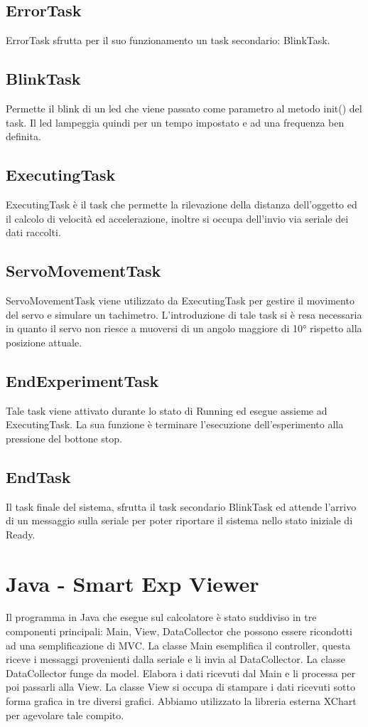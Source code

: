 \documentclass[a4paper,12pt]{report}
\begin{document}
\section{ErrorTask}
ErrorTask sfrutta per il suo funzionamento un task secondario: BlinkTask.

\section{BlinkTask}
Permette il blink di un led che viene passato come parametro al metodo init() del task. Il led lampeggia quindi per un tempo impostato e ad una frequenza ben definita.

\section{ExecutingTask}
ExecutingTask è il task che permette la rilevazione della distanza dell'oggetto ed il calcolo di velocità ed accelerazione, inoltre si occupa dell'invio via seriale dei dati raccolti.

\section{ServoMovementTask}
ServoMovementTask viene utilizzato da ExecutingTask per gestire il movimento del servo e simulare un tachimetro. L’introduzione di tale task si è resa necessaria in quanto il servo non riesce a muoversi di un angolo maggiore di 10° rispetto alla posizione attuale. 

\section{EndExperimentTask}
Tale task viene attivato durante lo stato di Running ed esegue assieme ad ExecutingTask. La sua funzione è terminare l'esecuzione dell'esperimento alla pressione del bottone stop.

\section{EndTask}
Il task finale del sistema, sfrutta il task secondario BlinkTask ed attende l'arrivo di un messaggio sulla seriale per poter riportare il sistema nello stato iniziale di Ready.

\chapter{Java - Smart Exp Viewer}
Il programma in Java che esegue sul calcolatore è stato suddiviso in tre componenti principali: Main, View, DataCollector che possono essere ricondotti ad una semplificazione di MVC.
La classe Main esemplifica il controller, questa riceve i messaggi provenienti dalla seriale e li invia al DataCollector.
La classe DataCollector funge da model. Elabora i dati ricevuti dal Main e li processa per poi passarli alla View.
La classe View si occupa di stampare i dati ricevuti sotto forma grafica in tre diversi grafici. Abbiamo utilizzato la libreria esterna XChart per agevolare tale compito.
\end{document}
